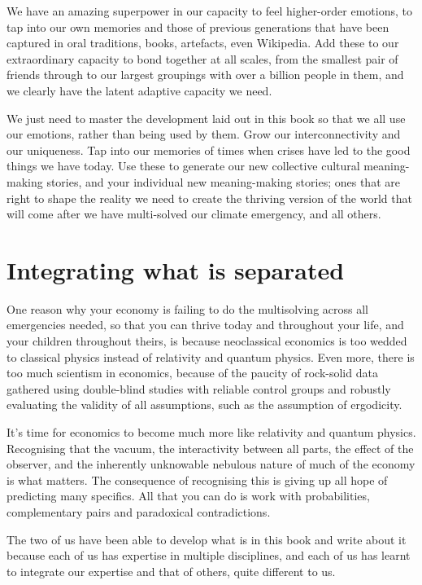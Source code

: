 We have an amazing superpower in our capacity to feel higher-order emotions, to tap into our own memories and those of previous generations that have been captured in oral traditions, books, artefacts, even Wikipedia. Add these to our extraordinary capacity to bond together at all scales, from the smallest pair of friends through to our largest groupings with over a billion people in them, and we clearly have the latent adaptive capacity we need.


We just need to master the development laid out in this book so that we all use our emotions, rather than being used by them. Grow our interconnectivity and our uniqueness. Tap into our memories of times when crises have led to the good things we have today. Use these to generate our new collective cultural meaning-making stories, and your individual new meaning-making stories; ones that are right to shape the reality we need to create the thriving version of the world that will come after we have multi-solved our climate emergency, and all others.
\section{Integrating what is separated}
One reason why your economy is failing to do the multisolving across all emergencies needed, so that you can thrive today and throughout your life, and your children throughout theirs, is because neoclassical economics is too wedded to classical physics instead of relativity and quantum physics. Even more, there is too much scientism in economics, because of the paucity of rock-solid data gathered using double-blind studies with reliable control groups and robustly evaluating the validity of all assumptions, such as the assumption of ergodicity\cite{buchanan-ergodicity, peters-ergodicity-economics}.


It's time for economics  to become much more like relativity and quantum physics. Recognising that the vacuum, the interactivity between all parts, the effect of the observer, and the inherently unknowable nebulous nature of much of the economy is what matters. The consequence of recognising this is giving up all hope of predicting many specifics. All that you can do is work with probabilities, complementary pairs and paradoxical contradictions.


The two of us have been able to develop what is in this book and write about it because each of us has expertise in multiple disciplines, and each of us has learnt to integrate our expertise and that of others, quite different to us. 


